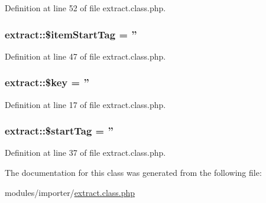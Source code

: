 Definition at line 52 of file extract.\-class.\-php.

\hypertarget{classextract_a11629128aedd1fc4b0a889640c693d0a}{
\subsubsection[{\$item\-Start\-Tag}]{\setlength{\rightskip}{0pt plus 5cm}extract\-::\$item\-Start\-Tag = ''}}\label{classextract_a11629128aedd1fc4b0a889640c693d0a}


Definition at line 47 of file extract.\-class.\-php.

\hypertarget{classextract_a894aac7e47b9ed0773922aa7eb9ce578}{
\subsubsection[{\$key}]{\setlength{\rightskip}{0pt plus 5cm}extract\-::\$key = ''}}\label{classextract_a894aac7e47b9ed0773922aa7eb9ce578}


Definition at line 17 of file extract.\-class.\-php.

\hypertarget{classextract_a3acbe3af3d1b083b33023202a5e05432}{
\subsubsection[{\$start\-Tag}]{\setlength{\rightskip}{0pt plus 5cm}extract\-::\$start\-Tag = ''}}\label{classextract_a3acbe3af3d1b083b33023202a5e05432}


Definition at line 37 of file extract.\-class.\-php.



The documentation for this class was generated from the following file\-:\begin{DoxyCompactItemize}
\item 
modules/importer/\hyperlink{extract_8class_8php}{extract.\-class.\-php}\end{DoxyCompactItemize}
